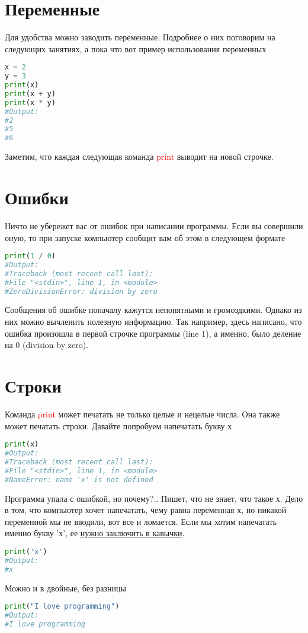 \documentclass[12pt]{article} %
\newcommand \tab[1][1cm]{\hspace*{#1}}
\begin{document}
\section{Переменные}
\tab Для удобства можно заводить переменные. Подробнее о них поговорим на следующих занятиях, а пока что вот пример использования переменных
\begin{lstlisting}[language=Python]
x = 2
y = 3
print(x)
print(x + y)
print(x * y)
#Output:
#2
#5
#6
\end{lstlisting}
\tab Заметим, что каждая следующая команда \textcolor{red}{print} выводит на новой строчке.
\section{Ошибки}
\tab Ничто не убережет вас от ошибок при написании программы. Если вы совершили оную, то при запуске компьютер сообщит вам об этом в следующем формате
\begin{lstlisting}[language=Python]
print(1 / 0)
#Output:
#Traceback (most recent call last):
#File "<stdin>", line 1, in <module>
#ZeroDivisionError: division by zero
\end{lstlisting}
\tab Сообщения об ошибке поначалу кажутся непонятными и громоздкими. Однако из них можно вычленить полезную информацию. Так например, здесь написано, что ошибка произошла в первой строчке программы (line 1), а именно, было деление на 0 (division by zero). 
\section{Строки}
\tab Команда \textcolor{red}{print} может печатать не только целые и нецелые числа. Она также может печатать строки. Давайте попробуем напечатать букву х
\begin{lstlisting}[language=Python]
print(x)
#Output:
#Traceback (most recent call last):
#File "<stdin>", line 1, in <module>
#NameError: name 'x' is not defined
\end{lstlisting}
\tab Программа упала с ошибкой, но почему?.. Пишет, что не знает, что такое х. Дело в том, что компьютер хочет напечатать, чему равна переменная х, но никакой переменной мы не вводили, вот все и ломается. Если мы хотим напечатать именно букву 'х', ее \underline{нужно заключить в кавычки}.
\begin{lstlisting}[language=Python]
print('x')
#Output:
#x
\end{lstlisting}
Можно и в двойные, без разницы
\begin{lstlisting}[language=Python]
print("I love programming")
#Output:
#I love programming
\end{lstlisting}
\end{document}
